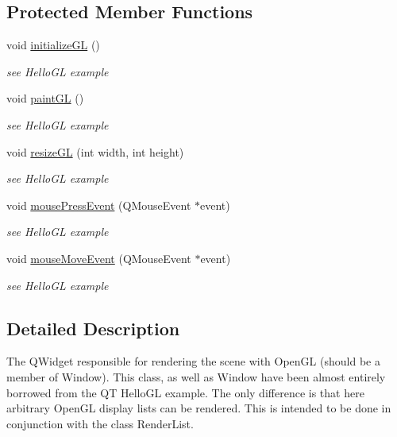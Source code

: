 \subsection*{Protected Member Functions}
\begin{DoxyCompactItemize}
\item 
void \hyperlink{class_g_l_widget_a7fab13e8cc9fc0730ca54c08b2c923a7}{initializeGL} ()
\begin{DoxyCompactList}\small\item\em see HelloGL example \item\end{DoxyCompactList}\item 
void \hyperlink{class_g_l_widget_a640b5570cb2b37724fd5b58a77339c5e}{paintGL} ()
\begin{DoxyCompactList}\small\item\em see HelloGL example \item\end{DoxyCompactList}\item 
void \hyperlink{class_g_l_widget_ac0d2a8ecf60907a81c0d73475d851025}{resizeGL} (int width, int height)
\begin{DoxyCompactList}\small\item\em see HelloGL example \item\end{DoxyCompactList}\item 
void \hyperlink{class_g_l_widget_ab144cc8064c1bbf6d0ef0646ca0bd06c}{mousePressEvent} (QMouseEvent $\ast$event)
\begin{DoxyCompactList}\small\item\em see HelloGL example \item\end{DoxyCompactList}\item 
void \hyperlink{class_g_l_widget_a9043bac13d6f0a5307ea5c7f9b3caa50}{mouseMoveEvent} (QMouseEvent $\ast$event)
\begin{DoxyCompactList}\small\item\em see HelloGL example \item\end{DoxyCompactList}\end{DoxyCompactItemize}


\subsection{Detailed Description}
The QWidget responsible for rendering the scene with OpenGL (should be a member of Window). This class, as well as Window have been almost entirely borrowed from the QT HelloGL example. The only difference is that here arbitrary OpenGL display lists can be rendered. This is intended to be done in conjunction with the class RenderList.

